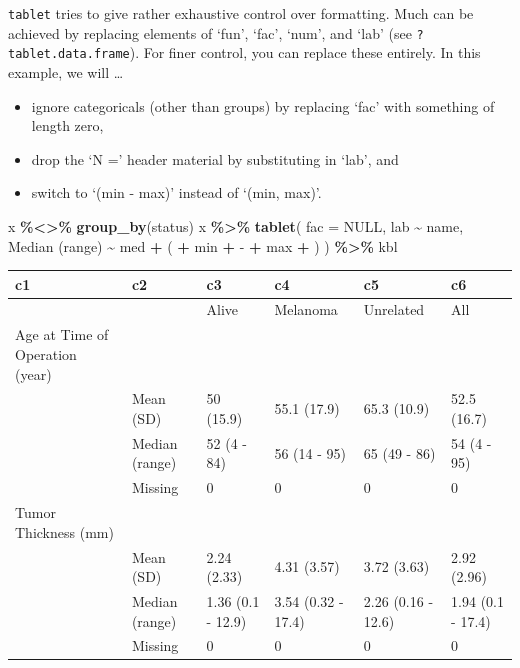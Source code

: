 \documentclass[
]{article}
\newenvironment{Shaded}{\begin{snugshade}}{\end{snugshade}}
\newcommand{\AttributeTok}[1]{\textcolor[rgb]{0.13,0.29,0.53}{#1}}
\newcommand{\ConstantTok}[1]{\textcolor[rgb]{0.56,0.35,0.01}{#1}}
\newcommand{\FunctionTok}[1]{\textcolor[rgb]{0.13,0.29,0.53}{\textbf{#1}}}
\newcommand{\NormalTok}[1]{#1}
\newcommand{\SpecialCharTok}[1]{\textcolor[rgb]{0.81,0.36,0.00}{\textbf{#1}}}
\newcommand{\StringTok}[1]{\textcolor[rgb]{0.31,0.60,0.02}{#1}}
\begin{document}
\texttt{tablet} tries to give rather exhaustive control over formatting.
Much can be achieved by replacing elements of `fun', `fac', `num', and
`lab' (see \texttt{?tablet.data.frame}). For finer control, you can
replace these entirely. In this example, we will \ldots{}

\begin{itemize}
\item
  ignore categoricals (other than groups) by replacing `fac' with
  something of length zero,
\item
  drop the `N =' header material by substituting in `lab', and
\item
  switch to `(min - max)' instead of `(min, max)'.
\end{itemize}

\begin{Shaded}
\begin{Highlighting}[]
\NormalTok{x }\SpecialCharTok{\%\textless{}\textgreater{}\%} \FunctionTok{group\_by}\NormalTok{(status)}
\NormalTok{x }\SpecialCharTok{\%\textgreater{}\%} 
  \FunctionTok{tablet}\NormalTok{(}
    \AttributeTok{fac =} \ConstantTok{NULL}\NormalTok{,}
\NormalTok{    lab }\SpecialCharTok{\textasciitilde{}}\NormalTok{ name,}
    \StringTok{\textasciigrave{}}\AttributeTok{Median (range)}\StringTok{\textasciigrave{}} \SpecialCharTok{\textasciitilde{}}\NormalTok{ med }\SpecialCharTok{+} \StringTok{\textquotesingle{} (\textquotesingle{}} \SpecialCharTok{+}\NormalTok{ min }\SpecialCharTok{+} \StringTok{\textquotesingle{} {-} \textquotesingle{}} \SpecialCharTok{+}\NormalTok{ max }\SpecialCharTok{+} \StringTok{\textquotesingle{})\textquotesingle{}}
\NormalTok{  ) }\SpecialCharTok{\%\textgreater{}\%} 
\NormalTok{  kbl}
\end{Highlighting}
\end{Shaded}

\begin{tabular}[t]{l|l|l|l|l|l}
\hline
c1 & c2 & c3 & c4 & c5 & c6\\
\hline
 &  & Alive & Melanoma & Unrelated & All\\
\hline
Age at Time of Operation (year) &  &  &  &  & \\
\hline
 & Mean (SD) & 50 (15.9) & 55.1 (17.9) & 65.3 (10.9) & 52.5 (16.7)\\
\hline
 & Median (range) & 52 (4 - 84) & 56 (14 - 95) & 65 (49 - 86) & 54 (4 - 95)\\
\hline
 & Missing & 0 & 0 & 0 & 0\\
\hline
Tumor Thickness (mm) &  &  &  &  & \\
\hline
 & Mean (SD) & 2.24 (2.33) & 4.31 (3.57) & 3.72 (3.63) & 2.92 (2.96)\\
\hline
 & Median (range) & 1.36 (0.1 - 12.9) & 3.54 (0.32 - 17.4) & 2.26 (0.16 - 12.6) & 1.94 (0.1 - 17.4)\\
\hline
 & Missing & 0 & 0 & 0 & 0\\
\hline
\end{tabular}
\end{document}
